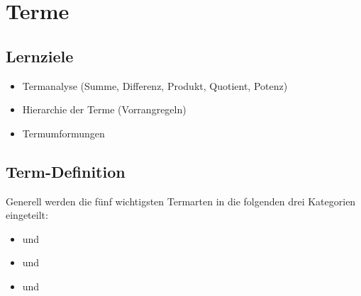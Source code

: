 
\section{Terme}

\subsection*{Lernziele}

\begin{itemize}
 \item Termanalyse (Summe, Differenz, Produkt, Quotient, Potenz)
 \item Hierarchie der Terme (Vorrangregeln)
 \item Termumformungen
\end{itemize}


\newpage

\subsection{Term-Definition}


Generell werden die fünf wichtigsten Termarten in die folgenden drei Kategorien eingeteilt:
\begin{itemize}
\item {} und 
\item {} und 
\item {} und 
\end{itemize}


